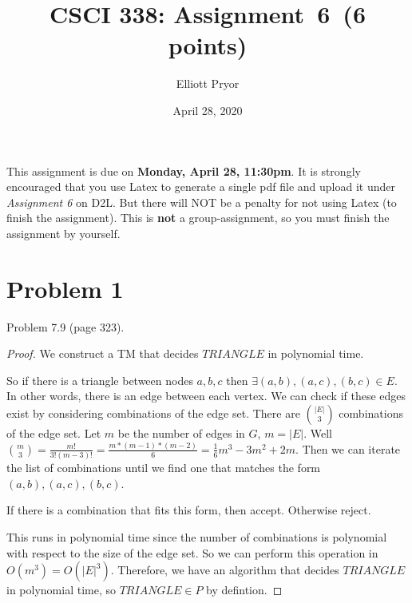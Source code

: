 \documentclass[11pt]{article}
\begin{document}
\date{April 28, 2020}
\title{CSCI 338: Assignment~6~(6 points)}

\author{Elliott Pryor}


\maketitle

\noindent
This assignment is due on {\bf Monday, April 28, 11:30pm}. It is strongly
encouraged that you use Latex to generate a single pdf file and upload it
under {\em Assignment 6} on D2L. But there will NOT be a penalty for not
using Latex (to finish the assignment). This is {\bf not} a group-assignment,
so you must finish the assignment by yourself.

\section*{Problem 1}

Problem 7.9 (page 323).
\newline


\begin{proof}


We construct a TM that decides $TRIANGLE$ in polynomial time. 

So if there is a triangle between nodes $a, b, c$ then $\exists (a, b), (a,c), (b, c) \in E$. In other words, there is an edge between each vertex. We can check if these edges exist by considering combinations of the edge set. There are ${|E| \choose 3}$ combinations of the edge set. Let $m$ be the number of edges in $G$, $m = |E|$.  Well ${m \choose 3 } = \frac{m!}{3! (m - 3)!} = \frac{m * (m-1) * (m-2)}{6} = \frac{1}{6} m^3 - 3m^2 + 2m$. Then we can iterate the list of combinations until we find one that matches the form $(a, b), (a,c), (b, c)$. 

If there is a combination that fits this form, then accept. Otherwise reject.

This runs in polynomial time since the number of combinations is polynomial with respect to the size of the edge set. So we can perform this operation in $O(m^3) = O(|E|^3)$. Therefore, we have an algorithm that decides $TRIANGLE$ in polynomial time, so $TRIANGLE \in P$ by defintion.

\end{proof}
\end{document}
